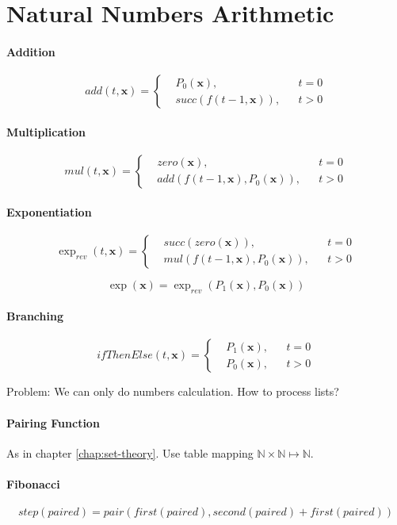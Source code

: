 \section{Natural Numbers Arithmetic}

\paragraph{Addition}

$$
add(t,\mathbf{x}) = \left\{\begin{aligned}& P_0(\mathbf{x}), && t = 0\\
& succ(f(t-1,\mathbf{x})), && t > 0
\end{aligned}
\right.
$$

\paragraph{Multiplication}

$$
mul(t,\mathbf{x}) = \left\{\begin{aligned}& zero(\mathbf{x}), && t = 0\\
& add(f(t-1,\mathbf{x}), P_0(\mathbf{x})), && t > 0
\end{aligned}
\right.
$$

\paragraph{Exponentiation}

$$
\exp_{rev}(t,\mathbf{x}) = \left\{\begin{aligned}& succ(zero(\mathbf{x})), && t = 0\\
& mul(f(t-1,\mathbf{x}), P_0(\mathbf{x})), && t > 0
\end{aligned}
\right.
$$

$$
\exp(\mathbf{x}) = \exp_{rev}(P_1(\mathbf{x}), P_0(\mathbf{x}))
$$

\paragraph{Branching}

$$
ifThenElse(t,\mathbf{x}) = \left\{\begin{aligned}& P_1(\mathbf{x}), && t = 0\\
& P_0(\mathbf{x}), && t > 0
\end{aligned}
\right.
$$

Problem: We can only do numbers calculation. How to process lists?

\paragraph{Pairing Function} As in chapter \ref{chap:set-theory}. Use table mapping $\mathbb{N} \times \mathbb{N} \mapsto \mathbb{N}$.

\paragraph{Fibonacci}

\[step(paired) = pair(first(paired), second(paired)+first(paired))\]
